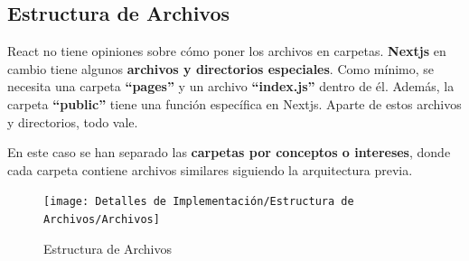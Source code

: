 \documentclass[12pt,twoside,titlepage]{report}
\begin{document}
\subsection{Estructura de Archivos}

React no tiene opiniones sobre cómo poner los archivos en carpetas. \textbf{Nextjs} en cambio tiene algunos \textbf{archivos y directorios especiales}. Como mínimo, se necesita una carpeta \textbf{``pages''} y un archivo \textbf{``index.js''} dentro de él. Además, la carpeta \textbf{``public''} tiene una función específica en Nextjs. Aparte de estos archivos y directorios, todo vale.

En este caso se han separado las \textbf{carpetas por conceptos o intereses}, donde cada carpeta contiene archivos similares siguiendo la arquitectura previa.

\begin{figure}[H]
    \centering
    \texttt{[image: Detalles de Implementación/Estructura de Archivos/Archivos]}
    \label{fig:Archivos}
    \caption{Estructura de Archivos}
\end{figure}
\end{document}

